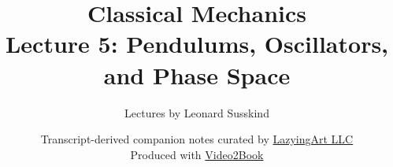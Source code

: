 \documentclass[11pt,oneside]{book}
\begin{document}
\hypersetup{pageanchor=false}
\frontmatter
\title{Classical Mechanics\\[0.45em]
\large Lecture 5: Pendulums, Oscillators, and Phase Space}
\author{Lectures by Leonard Susskind}
\date{Transcript-derived companion notes curated by
\href{https://lazying.art}{LazyingArt LLC}\\[0.35em]
\small Produced with
\href{https://github.com/lachlanchen/Video2Book}{Video2Book}}
\maketitle
\hypersetup{pageanchor=true}
\mainmatter

\end{document}
